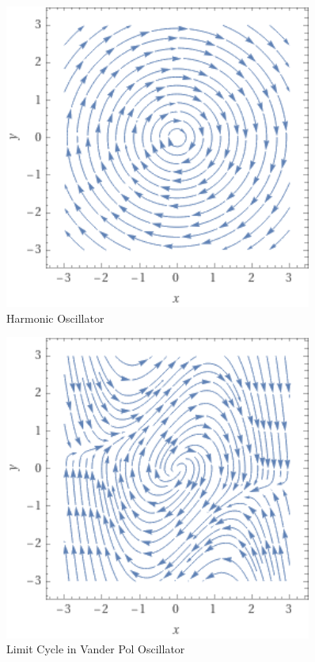 \begin{minipage}
    {0.5\textwidth}
    \begin{figure}[H]
        \centering
        \includegraphics[width=0.9\textwidth]{figures/phaseportraits/osc.png}
        \caption{Harmonic Oscillator}
        \label{fig:harmonic-oscillator}
    \end{figure}
\end{minipage}
\begin{minipage}
    {0.5\textwidth}
    \begin{figure}[H]
        \centering
        \includegraphics[width=0.9\textwidth]{figures/phaseportraits/van.png}
        \caption{Limit Cycle in Vander Pol Oscillator}
        \label{fig:van-der-pol-oscillator}
    \end{figure}
\end{minipage}


